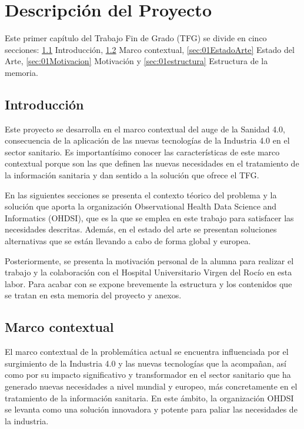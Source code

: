 \chapter{Descripción del Proyecto}\label{cap:01introduccion}

Este primer capítulo del Trabajo Fin de Grado (TFG) se divide en cinco secciones: \ref{sec:01intro} Introducción, \ref{sec:01Contexto} Marco contextual, \ref{sec:01EstadoArte} Estado del Arte, \ref{sec:01Motivacion} Motivación y \ref{sec:01estructura} Estructura de la memoria.

\section{Introducción} \label{sec:01intro}

Este proyecto se desarrolla en el marco contextual del auge de la Sanidad 4.0, consecuencia de la aplicación de las nuevas tecnologías de la Industria 4.0 en el sector sanitario. Es importantísimo conocer las características de este marco contextual porque son las que definen las nuevas necesidades en el tratamiento de la información sanitaria y dan sentido a la solución que ofrece el TFG.

En las siguientes secciones se presenta el contexto téorico del problema y la solución que aporta la organización Observational Health Data Science and Informatics (OHDSI), que es la que se emplea en este trabajo para satisfacer las necesidades descritas. Además, en el estado del arte se presentan soluciones alternativas que se están llevando a cabo de forma global y europea.

Posteriormente, se presenta la motivación personal de la alumna para realizar el trabajo y la colaboración con el Hospital Universitario Virgen del Rocío en esta labor. Para acabar con se expone brevemente la estructura y los contenidos que se tratan en esta memoria del proyecto y anexos.


\section{Marco contextual} \label{sec:01Contexto} 

El marco contextual de la problemática actual se encuentra influenciada por el surgimiento de la Industria 4.0 y las nuevas tecnologías que la acompañan, así como por su impacto significativo y transformador en el sector sanitario que ha generado nuevas necesidades a nivel mundial y europeo, más concretamente en el tratamiento de la información sanitaria. En este ámbito, la organización OHDSI se levanta como una solución innovadora y potente para paliar las necesidades de la industria.

